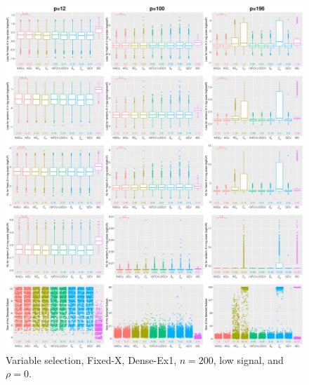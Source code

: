 \begin{figure}[!ht]
\centering
\includegraphics[width=\textwidth]{figures/supplement/fixedx/subset_selection/Dense-Ex1_n200_lsnr_rho0.eps}
\caption{Variable selection, Fixed-X, Dense-Ex1, $n=200$, low signal, and $\rho=0$.}
\end{figure}
\clearpage

